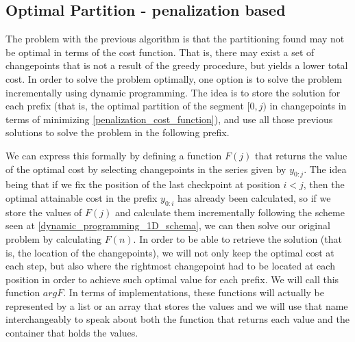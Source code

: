\documentclass[pdflatex,sn-mathphys]{sn-jnl}%
\theoremstyle{thmstyleone}%
\theoremstyle{thmstyletwo}%
\theoremstyle{thmstylethree}%
\begin{document}
\subsection{Optimal Partition - penalization based}\label{penalization_based}

The problem with the previous algorithm is that the partitioning found may not be optimal in terms of the cost function. That is, there may exist a set of changepoints that is not a result of the greedy procedure, but yields a lower total cost. In order to solve the problem optimally, one option is to solve the problem incrementally using dynamic programming. The idea is to store the solution for each prefix (that is, the optimal partition of the segment $[0,j)$ in changepoints in terms of minimizing \ref{penalization_cost_function}), and use all those previous solutions to solve the problem in the following prefix. 

We can express this formally by defining a function $F(j)$ that returns the value of the optimal cost by selecting changepoints in the series given by $y_{0:j}$. The idea being that if we fix the position of the last checkpoint at position $i < j$, then the optimal attainable cost in the prefix $y_{0:i}$ has already been calculated, so if we store the values of $F(j)$ and calculate them incrementally following the scheme seen at \ref{dynamic_programming_1D_schema}, we can then solve our original problem by calculating $F(n)$. In order to be able to retrieve the solution (that is, the location of the changepoints), we will not only keep the optimal cost at each step, but also where the rightmost changepoint had to be located at each position in order to achieve such optimal value for each prefix. We will call this function $argF$. In terms of implementations, these functions will actually be represented by a list or an array that stores the values and we will use that name interchangeably to speak about both the function that returns each value and the container that holds the values.
\end{document}
